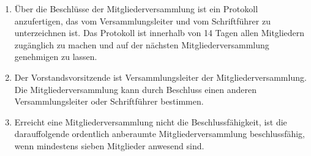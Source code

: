 \documentclass[a4paper,DIV10,12pt,headsepline]{scrartcl}
\begin{document}
\begin{enumerate}
	\item Über die Beschlüsse der Mitgliederversammlung ist ein Protokoll anzufertigen, das vom Versammlungsleiter und vom Schriftführer zu unterzeichnen ist. Das Protokoll ist innerhalb von 14 Tagen allen Mitgliedern zugänglich zu machen und auf der nächsten Mitgliederversammlung genehmigen zu lassen.
	\item Der Vorstandsvorsitzende ist Versammlungsleiter der Mitgliederversammlung. Die Mitgliederversammlung kann durch Beschluss einen anderen Versammlungsleiter oder Schriftführer bestimmen.
        \item Erreicht eine Mitgliederversammlung nicht die Beschlussfähigkeit, ist die darauffolgende ordentlich anberaumte Mitgliederversammlung beschlussfähig, wenn mindestens sieben Mitglieder anwesend sind.
\end{enumerate}
\end{document}

